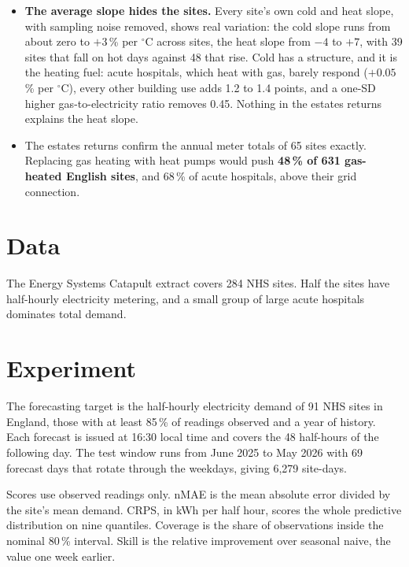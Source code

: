 \documentclass[10pt,a4paper]{article}
\newcommand{\tablefont}{\small\renewcommand{\arraystretch}{1.08}}
\newenvironment{figblock}{\par\medskip\noindent\begin{minipage}{\textwidth}}{\end{minipage}\par\medskip}
\begin{document}
\begin{tcolorbox}[colback=soft,colframe=soft,boxrule=0pt,arc=2pt,left=6pt,right=6pt,top=5pt,bottom=5pt]
\begin{itemize}
\item \textbf{The average slope hides the sites.} Every site's own cold and heat slope, with sampling noise removed, shows real variation: the cold slope runs from about zero to $+3$\,\% per $^\circ$C across sites, the heat slope from $-4$ to $+7$, with 39 sites that fall on hot days against 48 that rise. Cold has a structure, and it is the heating fuel: acute hospitals, which heat with gas, barely respond ($+0.05$\,\% per $^\circ$C), every other building use adds 1.2 to 1.4 points, and a one-SD higher gas-to-electricity ratio removes 0.45. Nothing in the estates returns explains the heat slope.
\item The estates returns confirm the annual meter totals of 65 sites exactly. Replacing gas heating with heat pumps would push \textbf{48\,\% of 631 gas-heated English sites}, and 68\,\% of acute hospitals, above their grid connection.
\end{itemize}
\end{tcolorbox}

\section{Data}
The Energy Systems Catapult extract covers 284 NHS sites. Half the sites have half-hourly electricity metering, and a small group of large acute hospitals dominates total demand.

\begin{figblock}\centering\tablefont

\end{figblock}

\section{Experiment}
The forecasting target is the half-hourly electricity demand of 91 NHS sites in England, those with at least 85\,\% of readings observed and a year of history. Each forecast is issued at 16:30 local time and covers the 48 half-hours of the following day. The test window runs from June 2025 to May 2026 with 69 forecast days that rotate through the weekdays, giving 6,279 site-days.

Scores use observed readings only. nMAE is the mean absolute error divided by the site's mean demand. CRPS, in kWh per half hour, scores the whole predictive distribution on nine quantiles. Coverage is the share of observations inside the nominal 80\,\% interval. Skill is the relative improvement over seasonal naive, the value one week earlier.
\end{document}
